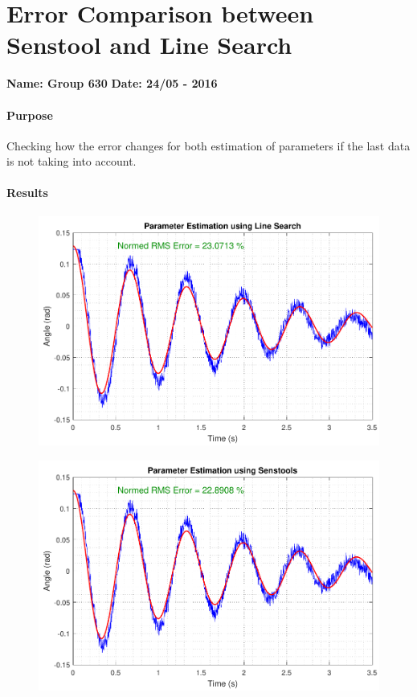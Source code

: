 \chapter{Error Comparison between Senstool and Line Search} \label{app:ErrorComp}
\textbf{Name: Group 630}
\textbf{Date: 24/05 - 2016}

\subsubsection{Purpose}
Checking how the error changes for both estimation of parameters if the last data is not taking into account.

\subsubsection{Results}
\begin{figure}[H]
		\centering
	\includegraphics[scale=.55]{figures/ErrorNoEndLineSearch}
	\label{ErrorNoEndLineSearch}
\end{figure}
%
\begin{figure}[H]
		\centering
	\includegraphics[scale=.55]{figures/ErrorNoEndSenstools}
	\label{ErrorNoEndSenstools}
\end{figure}